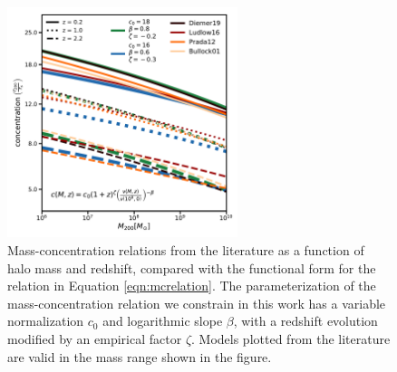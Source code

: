 \begin{figure}
	\centering
	\includegraphics[clip,trim=0cm 0cm 0cm
	0cm,width=0.6\textwidth,keepaspectratio]{./figures_mcrelation/mc_relations.pdf}
	\caption[Example plot of mass-concentration relations from the literature]{\label{fig:mcrelations} Mass-concentration relations from the literature as a function of halo mass and redshift, compared with the functional form for the relation in Equation \ref{eqn:mcrelation}. The parameterization of the mass-concentration relation we constrain in this work has a variable normalization $c_0$ and logarithmic slope $\beta$, with a redshift evolution modified by an empirical factor $\zeta$. Models plotted from the literature are valid in the mass range shown in the figure.}
\end{figure}	

